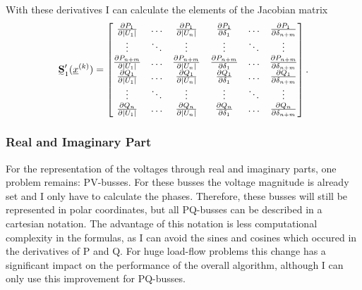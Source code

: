 With these derivatives I can calculate the elements of the Jacobian matrix
\begin{equation}
	\mat S_1' (\vec x^{(k)}) = 
	\begin{bmatrix}
		\frac{\partial P_1}{\partial |U_1|}	& \hdots	& \frac{\partial P_1}{\partial |U_n|}	& \frac{\partial P_1}{\partial \delta_1}	& \hdots	& \frac{\partial P_1}{\partial \delta_{n + m}} \\
		\vdots								& \ddots	& \vdots								& \vdots									& \ddots	& \vdots \\
		\frac{\partial P_{n + m}}{\partial |U_1|}	& \hdots	& \frac{\partial P_{n + m}}{\partial |U_n|}	& \frac{\partial P_{n + m}}{\partial \delta_1}	& \hdots	& \frac{\partial P_{n + m}}{\partial \delta_{n + m}} \\
		\frac{\partial Q_1}{\partial |U_1|}	& \hdots	& \frac{\partial Q_1}{\partial |U_n|}	& \frac{\partial Q_1}{\partial \delta_1}	& \hdots	& \frac{\partial Q_1}{\partial \delta_{n + m}} \\
		\vdots								& \ddots	& \vdots								& \vdots									& \ddots	& \vdots \\
		\frac{\partial Q_n}{\partial |U_1|}	& \hdots	& \frac{\partial Q_n}{\partial |U_n|}	& \frac{\partial Q_n}{\partial \delta_1}	& \hdots	& \frac{\partial Q_n}{\partial \delta_{n + m}}
	\end{bmatrix}.
	\label{eq:power_jacobian_newton_raphson}
\end{equation}

\subsubsection{Real and Imaginary Part}
For the representation of the voltages through real and imaginary parts, one problem remains: PV-busses. For these busses the voltage magnitude is already set and I only have to calculate the phases. Therefore, these busses will still be represented in polar coordinates, but all PQ-busses can be described in a cartesian notation. The advantage of this notation is less computational complexity in the formulas, as I can avoid the sines and cosines which occured in the derivatives of P and Q. For huge load-flow problems this change has a significant impact on the performance of the overall algorithm, although I can only use this improvement for PQ-busses.

